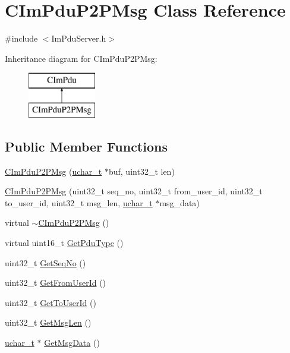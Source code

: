 \hypertarget{class_c_im_pdu_p2_p_msg}{}\section{C\+Im\+Pdu\+P2\+P\+Msg Class Reference}
\label{class_c_im_pdu_p2_p_msg}


{\ttfamily \#include $<$Im\+Pdu\+Server.\+h$>$}

Inheritance diagram for C\+Im\+Pdu\+P2\+P\+Msg\+:\begin{figure}[H]
\begin{center}
\leavevmode
\includegraphics[height=2.000000cm]{class_c_im_pdu_p2_p_msg}
\end{center}
\end{figure}
\subsection*{Public Member Functions}
\begin{DoxyCompactItemize}
\item 
\hyperlink{class_c_im_pdu_p2_p_msg_a70a1e82505db6bbf0dba5db820901099}{C\+Im\+Pdu\+P2\+P\+Msg} (\hyperlink{base_2ostype_8h_a124ea0f8f4a23a0a286b5582137f0b8d}{uchar\+\_\+t} $\ast$buf, uint32\+\_\+t len)
\item 
\hyperlink{class_c_im_pdu_p2_p_msg_a9af019cc3035d42254f37216d8643d31}{C\+Im\+Pdu\+P2\+P\+Msg} (uint32\+\_\+t seq\+\_\+no, uint32\+\_\+t from\+\_\+user\+\_\+id, uint32\+\_\+t to\+\_\+user\+\_\+id, uint32\+\_\+t msg\+\_\+len, \hyperlink{base_2ostype_8h_a124ea0f8f4a23a0a286b5582137f0b8d}{uchar\+\_\+t} $\ast$msg\+\_\+data)
\item 
virtual \hyperlink{class_c_im_pdu_p2_p_msg_a67c0cee970490074086b94fff63a616d}{$\sim$\+C\+Im\+Pdu\+P2\+P\+Msg} ()
\item 
virtual uint16\+\_\+t \hyperlink{class_c_im_pdu_p2_p_msg_a8e178fdf6467d5990c2abbeb54828d1c}{Get\+Pdu\+Type} ()
\item 
uint32\+\_\+t \hyperlink{class_c_im_pdu_p2_p_msg_a188c91f1505cd1e665bf08c0973db846}{Get\+Seq\+No} ()
\item 
uint32\+\_\+t \hyperlink{class_c_im_pdu_p2_p_msg_a40de5532a9e5f4ed2ccaff3b0b977964}{Get\+From\+User\+Id} ()
\item 
uint32\+\_\+t \hyperlink{class_c_im_pdu_p2_p_msg_aa61158a0d6a7f41dc7b9919a135b93e7}{Get\+To\+User\+Id} ()
\item 
uint32\+\_\+t \hyperlink{class_c_im_pdu_p2_p_msg_aff57fcac824b7b1000585baf57b792ce}{Get\+Msg\+Len} ()
\item 
\hyperlink{base_2ostype_8h_a124ea0f8f4a23a0a286b5582137f0b8d}{uchar\+\_\+t} $\ast$ \hyperlink{class_c_im_pdu_p2_p_msg_aabe0fae3ca5f64915b394ea1235832a1}{Get\+Msg\+Data} ()
\end{DoxyCompactItemize}
